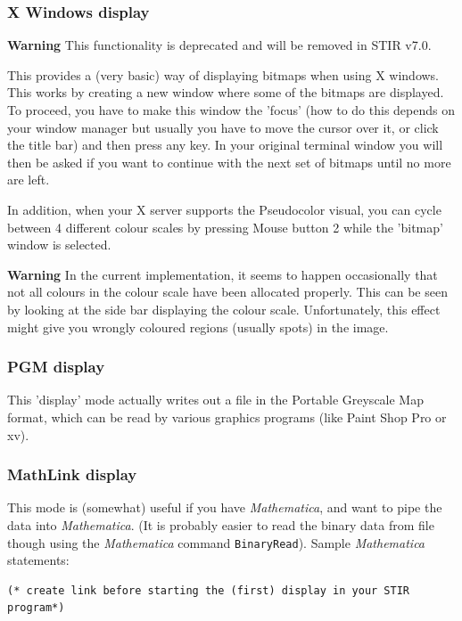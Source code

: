 \documentclass{article}
\begin{document}
{{{{{{\subsubsection{
X Windows display}
\label{sec:displayX}
\textbf{Warning} This functionality is deprecated and will be removed in STIR v7.0.

This provides a (very basic) way of displaying bitmaps when using 
X windows. This works by creating a new window where some of 
the bitmaps are displayed. To proceed, you have to make this 
window the 'focus' (how to do this depends on your window manager 
but usually you have to move the cursor over it, or click the 
title bar) and then press any key. In your original terminal 
window you will then be asked if you want to continue with the 
next set of bitmaps until no more are left.


In addition, when your X server supports the Pseudocolor visual, 
you can cycle between 4 different colour scales by pressing Mouse 
button 2 while the 'bitmap' window is selected.


\textbf{Warning} In the current implementation, it seems to happen 
occasionally that not all colours in the colour scale have been 
allocated properly. This can be seen by looking at the side bar 
displaying the colour scale. Unfortunately, this effect might 
give you wrongly coloured regions (usually spots) in the image.


\subsubsection{
PGM display}

This 'display' mode actually writes out a file in the Portable 
Greyscale Map format, which can be read by various graphics programs 
(like Paint Shop Pro or xv).


\subsubsection{
MathLink display}

This mode is (somewhat) useful if you have \textit{Mathematica\texttrademark}, 
and want to pipe the data into \textit{Mathematica}. (It is probably 
easier to read the binary data from file though using the \textit{Mathematica} command \texttt{BinaryRead}). 
Sample \textit{Mathematica} statements:

\begin{verbatim}
(* create link before starting the (first) display in your STIR 
program*)


\end{verbatim}}}}}}}
\end{document}
